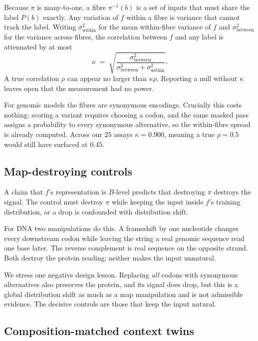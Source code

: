 \documentclass[11pt]{article}
\begin{document}
Because $\pi$ is many-to-one, a fibre $\pi^{-1}(b)$ is a set of inputs that must
share the label $P(b)$ exactly. Any variation of $f$ within a fibre is variance
that cannot track the label. Writing $\sigma^2_{\text{within}}$ for the mean
within-fibre variance of $f$ and $\sigma^2_{\text{between}}$ for the variance
across fibres, the correlation between $f$ and any label is attenuated by at most
\begin{equation}
\kappa \;=\; \sqrt{\frac{\sigma^2_{\text{between}}}{\sigma^2_{\text{between}} +
\sigma^2_{\text{within}}}}.
\end{equation}
A true correlation $\rho$ can appear no larger than $\kappa\rho$. Reporting a null
without $\kappa$ leaves open that the measurement had no power.

For genomic models the fibres are synonymous encodings. Crucially this costs
nothing: scoring a variant requires choosing a codon, and the same masked pass
assigns a probability to every synonymous alternative, so the within-fibre spread
is already computed. Across our 25 assays $\kappa = 0.900$, meaning a true
$\rho=0.5$ would still have surfaced at $0.45$.

\subsection{Map-destroying controls}
\label{sec:map}

A claim that $f$'s representation is $B$-level predicts that destroying $\pi$
destroys the signal. The control must destroy $\pi$ while keeping the input inside
$f$'s training distribution, or a drop is confounded with distribution shift.

For DNA two manipulations do this. A frameshift by one nucleotide changes every
downstream codon while leaving the string a real genomic sequence read one base
later. The reverse complement is real sequence on the opposite strand. Both destroy
the protein reading; neither makes the input unnatural.

We stress one negative design lesson. Replacing \emph{all} codons with synonymous
alternatives also preserves the protein, and its signal does drop, but this is a
global distribution shift as much as a map manipulation and is not admissible
evidence. The decisive controls are those that keep the input natural.

\subsection{Composition-matched context twins}
\label{sec:context}
\end{document}
